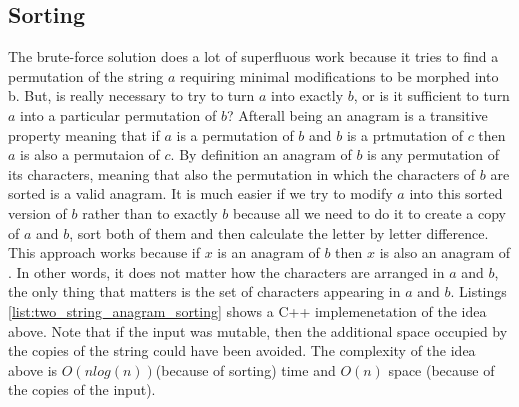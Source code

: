 \subsection{Sorting}
\label{sec:anagrams:sorting}
The brute-force solution does a lot of superfluous work because it tries to find a permutation of the string $a$
requiring  minimal modifications to be morphed into b.
But, is really necessary to try to turn $a$ into exactly $b$, or is it sufficient to turn $a$ into a particular permutation of $b$? 
Afterall being an anagram is a transitive property meaning that if $a$ is a permutation of $b$ and $b$ is a prtmutation of $c$ then $a$ is also a permutaion of $c$. 
By definition an anagram of $b$ is any permutation of its characters, meaning that also the permutation in which the characters of $b$ are sorted is a valid
anagram. It is much easier if we try to modify $a$ into this sorted version of $b$ rather than to exactly $b$ because all we need to do it to create
a copy of $a$ and $b$, sort both of them and then calculate the letter by letter difference.
This approach works because if $x$ is an anagram of $b$ then $x$ is also an
anagram of . In other words, it does not matter how the characters are arranged in $a$ and $b$, the only thing that matters is the set of characters
appearing in $a$ and $b$. Listings \ref{list:two_string_anagram_sorting} shows a C++ implemenetation of the idea above. 
Note that if the input was mutable, then the additional space occupied by the copies of the string
could have been avoided. The complexity of the idea above is $O(n log(n))$(because of sorting) time and $O(n)$ space (because of the copies of the input).

\begin{minipage}{\linewidth}
 	
\end{minipage}

